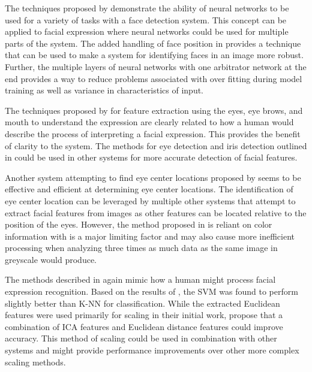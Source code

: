 \documentclass{IEEEtran}
\begin{document}
The techniques proposed by \cite{rowley1998nn} demonstrate the ability of neural networks to be used for a variety of tasks with a face detection system. This concept can be applied to facial expression where neural networks could be used for multiple parts of the system. The added handling of face position in \cite{rowley1998nn} provides a technique that can be used to make a system for identifying faces in an image more robust. Further, the multiple layers of neural networks with one arbitrator network at the end provides a way to reduce problems associated with over fitting during model training as well as variance in characteristics of input.

The techniques proposed by \cite{ioannou2007robust} for feature extraction using the eyes, eye brows, and mouth to understand the expression are clearly related to how a human would describe the process of interpreting a facial expression. This provides the benefit of clarity to the system. The methods for eye detection and iris detection outlined in \cite{ioannou2007robust} could be used in other systems for more accurate detection of facial features. 

Another system attempting to find eye center locations proposed by \cite{skodras2015precise} seems to be effective and efficient at determining eye center locations. The identification of eye center location can be leveraged by multiple other systems that attempt to extract facial features from images as other features can be located relative to the position of the eyes. However, the method proposed in \cite{skodras2015precise} is reliant on color information with is a major limiting factor and may also cause more inefficient processing when analyzing three times as much data as the same image in greyscale would produce.

The methods described in \cite{lei2006combination} again mimic how a human might process facial expression recognition. Based on the results of \cite{lei2006combination}, the SVM was found to perform slightly better than K-NN for classification.
While the extracted Euclidean features were used primarily for scaling in their initial work, \cite{lei2006combination} propose that a combination of ICA features and Euclidean distance features could improve accuracy. This method of scaling could be used in combination with other systems and might provide performance improvements over other more complex scaling methods.
\end{document}
